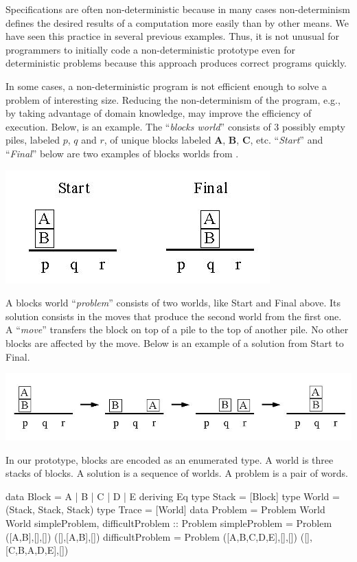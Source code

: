 Specifications are often non-deterministic because
in many cases non-determinism defines the desired results of
a computation more easily than by other means.
We have seen this practice in several previous examples.
Thus, it is not unusual for programmers to
initially code a non-deterministic prototype
even for deterministic problems because this approach
produces correct programs quickly.

In some cases, a non-deterministic program is not
efficient enough to solve a problem of interesting size.
Reducing the non-determinism of the program, e.g.,
by taking advantage of domain knowledge, 
may improve the efficiency of execution.
Below, is an example.
The ``\emph{blocks world}'' \cite{wiki:blocks-world}
consists of 3 possibly empty piles,
labeled $p$, $q$ and $r$,
of unique blocks labeled {\bf A}, {\bf B}, {\bf C}, etc.
``\emph{Start}'' and ``\emph{Final}'' below are two examples
of blocks worlds from \cite{Shute20blocks-world}.
%
\begin{center}
\includegraphics[scale=.5]{PICTURES/problem.jpg}
\end{center}
%
A blocks world ``\emph{problem}'' consists of two worlds,
like Start and Final above.
Its solution consists in the moves that produce the second world
from the first one.
A ``\emph{move}'' transfers the block on top of a pile
to the top of another pile. No other blocks are affected by the move.
Below is an example of a solution from Start to Final.
%
\begin{center}
\includegraphics[scale=.5]{PICTURES/solution.jpg}
\end{center}
%
In our prototype,
blocks are encoded as an enumerated type.
A world is three stacks of blocks.
A solution is a sequence of worlds.
A problem is a pair of words.
%
\begin{prog}
data Block = A | B | C | D | E deriving Eq
type Stack = [Block]
type World = (Stack, Stack, Stack)
type Trace = [World]
data Problem = Problem World World
\medskip
simpleProblem, difficultProblem :: Problem
simpleProblem = Problem ([A,B],[],[]) ([],[A,B],[])
difficultProblem = Problem ([A,B,C,D,E],[],[]) ([],[C,B,A,D,E],[])
\end{prog}
